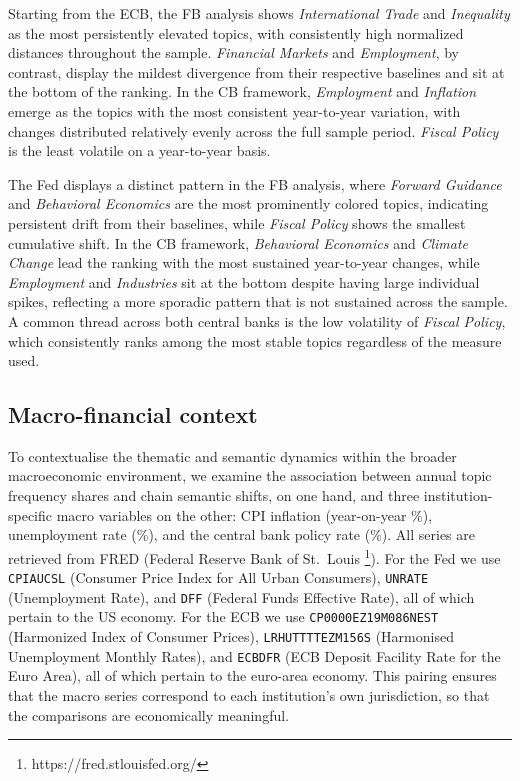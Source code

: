 Starting from the ECB, the FB analysis shows \textit{International Trade} and \textit{Inequality} as the most persistently elevated topics, with consistently high normalized distances throughout the sample. \textit{Financial Markets} and \textit{Employment}, by contrast, display the mildest divergence from their respective baselines and sit at the bottom of the ranking. In the CB framework, \textit{Employment} and \textit{Inflation} emerge as the topics with the most consistent year-to-year variation, with changes distributed relatively evenly across the full sample period. \textit{Fiscal Policy} is the least volatile on a year-to-year basis.

The Fed displays a distinct pattern in the FB analysis, where \textit{Forward Guidance} and \textit{Behavioral Economics} are the most prominently colored topics, indicating persistent drift from their baselines, while \textit{Fiscal Policy} shows the smallest cumulative shift. In the CB framework, \textit{Behavioral Economics} and \textit{Climate Change} lead the ranking with the most sustained year-to-year changes, while \textit{Employment} and \textit{Industries} sit at the bottom despite having large individual spikes, reflecting a more sporadic pattern that is not sustained across the sample.
A common thread across both central banks is the low volatility of \textit{Fiscal Policy}, which consistently ranks among the most stable topics regardless of the measure used.


\subsection{Macro-financial context}\label{subsec:macro}

To contextualise the thematic and semantic dynamics within the broader macroeconomic environment, we examine the association between annual topic frequency shares and chain semantic shifts, on one hand, and three institution-specific macro variables on the other: CPI inflation (year-on-year \%), unemployment rate (\%), and the central bank policy rate (\%). All series are retrieved from FRED (Federal Reserve Bank of St.\ Louis \footnote{https://fred.stlouisfed.org/}). For the Fed we use \texttt{CPIAUCSL} (Consumer Price Index for All Urban Consumers), \texttt{UNRATE} (Unemployment Rate), and \texttt{DFF} (Federal Funds Effective Rate), all of which pertain to the US economy. For the ECB we use \texttt{CP0000EZ19M086NEST} (Harmonized Index of Consumer Prices), \texttt{LRHUTTTTEZM156S} (Harmonised Unemployment Monthly Rates), and \texttt{ECBDFR} (ECB Deposit Facility Rate for the Euro Area), all of which pertain to the euro-area economy. This pairing ensures that the macro series correspond to each institution's own jurisdiction, so that the comparisons are economically meaningful.

